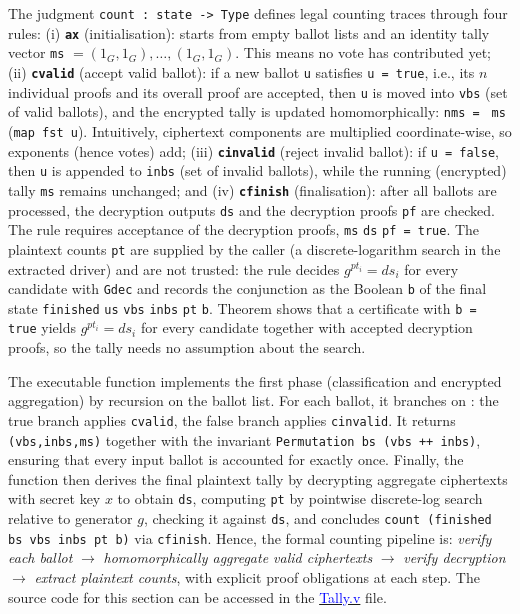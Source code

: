 The judgment \texttt{count : state -> Type} defines legal counting traces through four rules: 
(i) \textbf{\texttt{ax}} (initialisation): starts from empty ballot lists and an identity tally vector \texttt{ms} $= (1_G,1_G),\ldots,(1_G,1_G)$. This means no vote has contributed yet; 
(ii) \textbf{\texttt{cvalid}} (accept valid ballot): if a new ballot \texttt{u} satisfies \texttt{} \texttt{u = true}, i.e., its $n$ individual proofs and its overall proof are accepted, then \texttt{u} is moved into \texttt{vbs} (set of valid ballots), and the encrypted tally is updated homomorphically: \texttt{nms = } \texttt{ms} (\texttt{map fst u}). Intuitively, ciphertext components are multiplied coordinate-wise, so exponents (hence votes) add; 
(iii) \textbf{\texttt{cinvalid}} (reject invalid ballot): if \texttt{} \texttt{u = false}, then \texttt{u} is appended to \texttt{inbs} (set of invalid ballots), while the running (encrypted) tally \texttt{ms} remains unchanged; and 
(iv) \textbf{\texttt{cfinish}} (finalisation): after all ballots are processed, the decryption outputs \texttt{ds} and the decryption proofs \texttt{pf} are checked. The rule requires acceptance of the decryption proofs, \texttt{} \texttt{ms} \texttt{ds} \texttt{pf = true}. The plaintext counts \texttt{pt} are supplied by the caller (a discrete-logarithm search in the extracted driver) and are not trusted: the rule decides $g^{pt_i}=ds_i$ for every candidate with \texttt{Gdec} and records the conjunction as the Boolean \texttt{b} of the final state \texttt{finished} \texttt{us} \texttt{vbs} \texttt{inbs} \texttt{pt} \texttt{b}. Theorem \texttt{} shows that a certificate with \texttt{b = true} yields $g^{pt_i}=ds_i$ for every candidate together with accepted decryption proofs, so the tally needs no assumption about the search.

The executable function \texttt{} implements the first phase (classification and encrypted aggregation) by recursion on the ballot list. For each ballot, it branches on \texttt{}: the true branch applies \texttt{cvalid}, the false branch applies \texttt{cinvalid}. It returns \texttt{(vbs,inbs,ms)} together with the invariant \texttt{Permutation bs (vbs ++ inbs)}, ensuring that every input ballot is accounted for exactly once. Finally, the function \texttt{} then derives the final plaintext tally by decrypting aggregate ciphertexts with secret key $x$ to obtain \texttt{ds}, computing \texttt{pt} by pointwise discrete-log search relative to generator $g$, checking it against \texttt{ds}, and concludes \texttt{count (finished bs vbs inbs pt b)} via \texttt{cfinish}. Hence, the formal counting pipeline is: \emph{verify each ballot} $\to$ \emph{homomorphically aggregate valid ciphertexts} $\to$ \emph{verify decryption} $\to$ \emph{extract plaintext counts}, with explicit proof obligations at each step. The source code for this section can be accessed in the \href{https://anonymous.4open.science/r/SigmaProtocol-EBA5/src/Backend/Tally.v}{\textcolor{blue}{Tally.v}} file.


